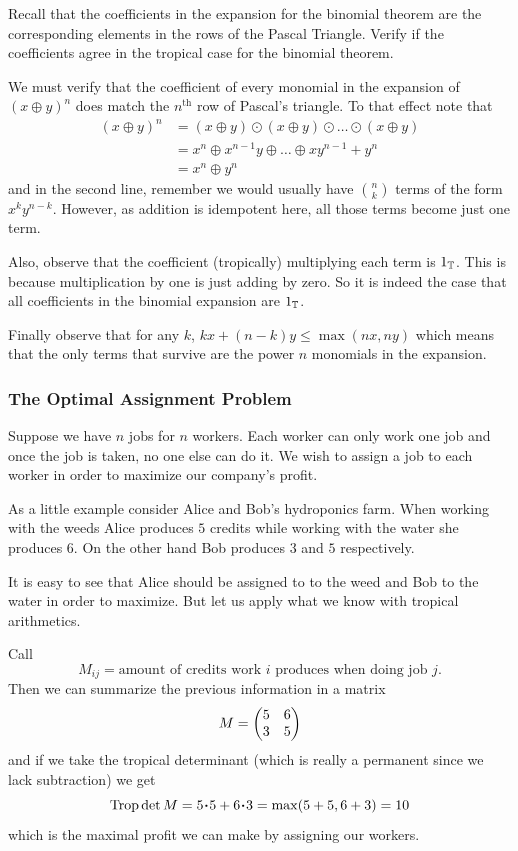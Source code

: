 \documentclass[12pt]{memoir}
\DeclareMathOperator{\Trop}{Trop}
\begin{document}
\begin{Ej}[2]
Recall that the coefficients in the expansion for the binomial theorem are the corresponding elements in the rows of the Pascal Triangle. Verify if the coefficients agree in the tropical case for the binomial theorem.
\end{Ej}

\begin{ptcb}
We must verify that the coefficient of every monomial in the expansion of $(x\oplus y)^n$ does match the $n^{\text{th}}$ row of Pascal's triangle. To that effect note that 
\begin{align*}
    (x\oplus y)^n&=(x\oplus y)\odot(x\oplus y)\odot\dots\odot(x\oplus y)\\
    &=x^n\oplus x^{n-1}y\oplus\dots\oplus xy^{n-1}+y^n\\
    &=x^n\oplus y^n
\end{align*}
and in the second line, remember we would usually have $\binom{n}{k}$ terms of the form $x^ky^{n-k}$. However, as addition is idempotent here, all those terms become just one term.\par 
Also, observe that the coefficient (tropically) multiplying each term is $1_{\mathbb{T}}$. This is because multiplication by one is just adding by zero. So it is indeed the case that all coefficients in the binomial expansion are $1_{\mathbb{T}}$.\par 
Finally observe that for any $k$, $kx+(n-k)y\leq\max(nx,ny)$ which means that the only terms that survive are the power $n$ monomials in the expansion. 
\end{ptcb}


\subsubsection{The Optimal Assignment Problem}

Suppose we have $n$ jobs for $n$ workers. Each worker can only work one job and once the job is taken, no one else can do it. We wish to assign a job to each worker in order to maximize our company's profit.

\begin{Ex}
    As a little example consider Alice and Bob's hydroponics farm. When working with the weeds Alice produces $5$ credits while working with the water she produces $6$. On the other hand Bob produces $3$ and $5$ respectively.\par 
    It is easy to see that Alice should be assigned to to the weed and Bob to the water in order to maximize. But let us apply what we know with tropical arithmetics.\par 
    Call 
    $$M_{ij}=\text{amount of credits work }i\text{ produces when doing job }j.$$
    Then we can summarize the previous information in a matrix 
    $$M=\begin{pmatrix} 5 & 6 \\ 3 & 5 \end{pmatrix}$$
    and if we take the tropical determinant (which is really a permanent since we lack subtraction) we get
    $$\Trop\det M=5\.5+6\.3=\max(5+5,6+3)=10$$
    which is the maximal profit we can make by assigning our workers.
\end{Ex}
\end{document}
